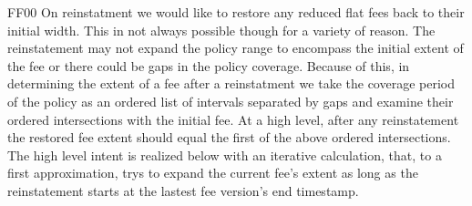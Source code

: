 \@pvspace{8.0pt}%
\begin{lcom}{7.5}%
\begin{cpar}{0}{F}{F}{0}{0}{}%
 On reinstatment we would like to restore any reduced flat fees back to their
 initial
 width. This in not always possible though for a variety of reason. The
 reinstatement
 may not expand the policy range to encompass the initial extent of the fee
 or there
 could be gaps in the policy coverage. Because of this, in determining the
 extent of
 a fee after a reinstatment we take the coverage period of the policy as an
 ordered
 list of intervals separated by gaps and examine their ordered intersections
 with the
 initial fee. At a high level, after any reinstatement the restored fee
 extent should
 equal the first of the above ordered intersections.
 The high level intent is realized below with an iterative calculation, that,
 to a first
 approximation, trys to expand the current fee\mbox{'}s extent as long as the
 reinstatement
 starts at the lastest fee version\mbox{'}s end timestamp.
\end{cpar}%
\end{lcom}%
%
%
%
%
%
%
%
%
%
%
%
%
%
%

